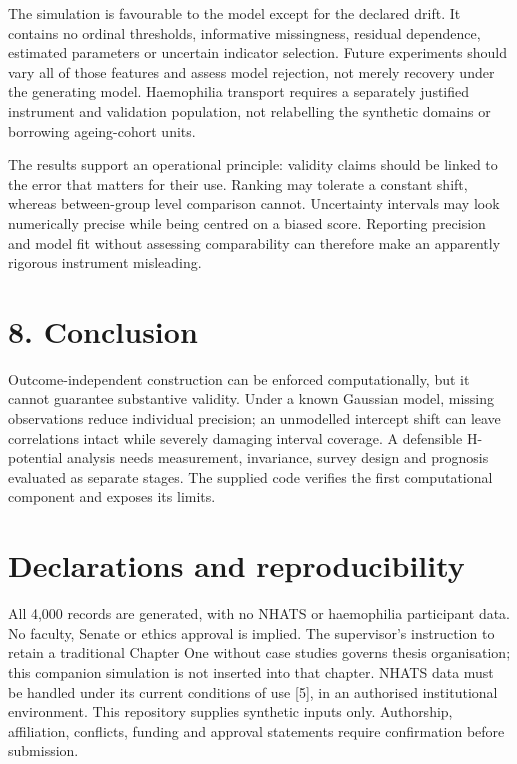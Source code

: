 \documentclass[11pt,a4paper]{article}
\begin{document}
The simulation is favourable to the model except for the declared drift. It contains no ordinal thresholds, informative missingness, residual dependence, estimated parameters or uncertain indicator selection. Future experiments should vary all of those features and assess model rejection, not merely recovery under the generating model. Haemophilia transport requires a separately justified instrument and validation population, not relabelling the synthetic domains or borrowing ageing-cohort units.

The results support an operational principle: validity claims should be linked to the error that matters for their use. Ranking may tolerate a constant shift, whereas between-group level comparison cannot. Uncertainty intervals may look numerically precise while being centred on a biased score. Reporting precision and model fit without assessing comparability can therefore make an apparently rigorous instrument misleading.

\section*{8. Conclusion}
Outcome-independent construction can be enforced computationally, but it cannot guarantee substantive validity. Under a known Gaussian model, missing observations reduce individual precision; an unmodelled intercept shift can leave correlations intact while severely damaging interval coverage. A defensible H-potential analysis needs measurement, invariance, survey design and prognosis evaluated as separate stages. The supplied code verifies the first computational component and exposes its limits.

\section*{Declarations and reproducibility}
All 4,000 records are generated, with no NHATS or haemophilia participant data. No faculty, Senate or ethics approval is implied. The supervisor's instruction to retain a traditional Chapter One without case studies governs thesis organisation; this companion simulation is not inserted into that chapter. NHATS data must be handled under its current conditions of use [5], in an authorised institutional environment. This repository supplies synthetic inputs only. Authorship, affiliation, conflicts, funding and approval statements require confirmation before submission.
\end{document}
